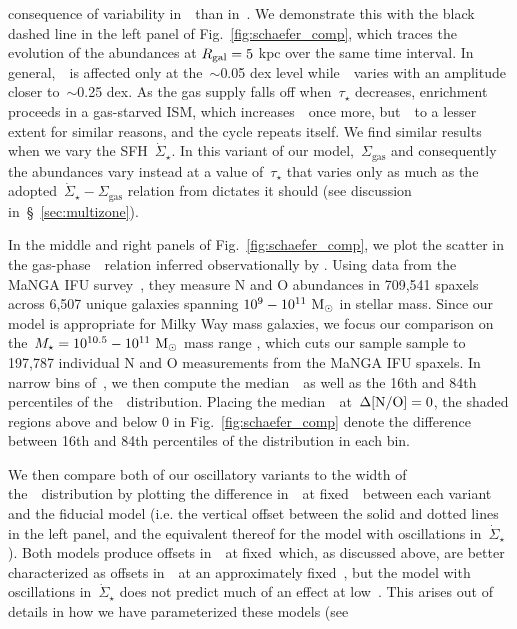 \documentclass[ms.tex]{subfiles}
\begin{document}
consequence of variability in~\oh~than in~\no.
We demonstrate this with the black dashed line in the left panel of
Fig.~\ref{fig:schaefer_comp}, which traces the evolution of the abundances at
$R_\text{gal} = 5$ kpc over the same time interval.
In general,~\no~is affected only at the~$\sim$0.05 dex level while~\oh~varies
with an amplitude closer to~$\sim$0.25 dex.
As the gas supply falls off when~$\tau_\star$ decreases, enrichment proceeds
in a gas-starved ISM, which increases~\oh~once more, but~\no~to a lesser
extent for similar reasons, and the cycle repeats itself.
We find similar results when we vary the SFH~$\dot{\Sigma}_\star$.
In this variant of our model,~$\Sigma_\text{gas}$ and consequently the
abundances vary instead at a value of~$\tau_\star$ that varies only as much as
the adopted~$\dot{\Sigma}_\star - \Sigma_\text{gas}$ relation from
\citet{Johnson2021} dictates it should (see discussion
in~\S~\ref{sec:multizone}).
\par
In the middle and right panels of Fig.~\ref{fig:schaefer_comp}, we plot the
scatter in the gas-phase~\ohno~relation inferred observationally by
\citet{Schaefer2020}.
Using data from the MaNGA IFU survey~\citep{Bundy2015}, they measure N and O
abundances in 709,541 spaxels across 6,507 unique galaxies spanning
$10^9 - 10^{11}~\text{M}_\odot$ in stellar mass.
Since our model is appropriate for Milky Way mass galaxies, we focus our
comparison on the~$M_\star = 10^{10.5} - 10^{11}~\text{M}_\odot$ mass range
\citep{Licquia2015}, which cuts our sample sample to 197,787 individual N and O
measurements from the MaNGA IFU spaxels.
In narrow bins of~\oh, we then compute the median~\no~as well as the 16th and
84th percentiles of the~\no~distribution.
Placing the median~\no~at~$\Delta\text{[N/O]} = 0$, the shaded regions above and below
0 in Fig.~\ref{fig:schaefer_comp} denote the difference between 16th and 84th
percentiles of the distribution in each bin.
\par
We then compare both of our oscillatory variants to the width of
the~\no~distribution by plotting the difference in~\no~at fixed~\oh~between
each variant and the fiducial model (i.e. the vertical offset between the solid
and dotted lines in the left panel, and the equivalent thereof for the model
with oscillations in~$\dot{\Sigma}_\star$).
Both models produce offsets in~\no~at fixed~\oh which, as discussed above, are
better characterized as offsets in~\oh~at an approximately fixed~\no, but the
model with oscillations in~$\dot{\Sigma}_\star$ does not predict much of an
effect at low~\oh.
This arises out of details in how we have parameterized these models (see
\end{document}
